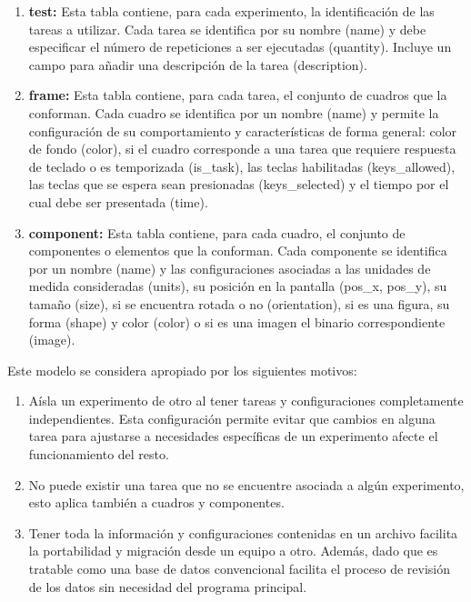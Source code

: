 \documentclass[\main/main.tex]{subfiles}
\begin{document}
\begin{enumerate}
				\item \textbf{test:} Esta tabla contiene, para cada experimento, la identificación de las tareas a utilizar. Cada tarea se identifica por su nombre (name) y debe especificar el número de repeticiones a ser ejecutadas (quantity). Incluye un campo para añadir una descripción de la tarea (description).

				\item \textbf{frame:} Esta tabla contiene, para cada tarea, el conjunto de cuadros que la conforman. Cada cuadro se identifica por un nombre (name) y permite la configuración de su comportamiento y características de forma general: color de fondo (color), si el cuadro corresponde a una tarea que requiere respuesta de teclado o es temporizada (is\_task), las teclas habilitadas (keys\_allowed), las teclas que se espera sean presionadas (keys\_selected) y el tiempo por el cual debe ser presentada (time).

				\item \textbf{component:} Esta tabla contiene, para cada cuadro, el conjunto de componentes o elementos que la conforman. Cada componente se identifica por un nombre (name) y las configuraciones asociadas a las unidades de medida consideradas (units), su posición en la pantalla (pos\_x, pos\_y), su tamaño (size), si se encuentra rotada o no (orientation), si es una figura, su forma (shape) y color (color) o si es una imagen el binario correspondiente (image). 
			\end{enumerate}

			Este modelo se considera apropiado por los siguientes motivos:
			\begin{enumerate}
				\item Aísla un experimento de otro al tener tareas y configuraciones completamente independientes. Esta configuración permite evitar que cambios en alguna tarea para ajustarse a necesidades específicas de un experimento afecte el funcionamiento del resto.

				\item No puede existir una tarea que no se encuentre asociada a algún experimento, esto aplica también a cuadros y componentes. 

				\item Tener toda la información y configuraciones contenidas en un archivo facilita la portabilidad y migración desde un equipo a otro. Además, dado que es tratable como una base de datos convencional facilita el proceso de revisión de los datos sin necesidad del programa principal.
			\end{enumerate}
\end{document}
